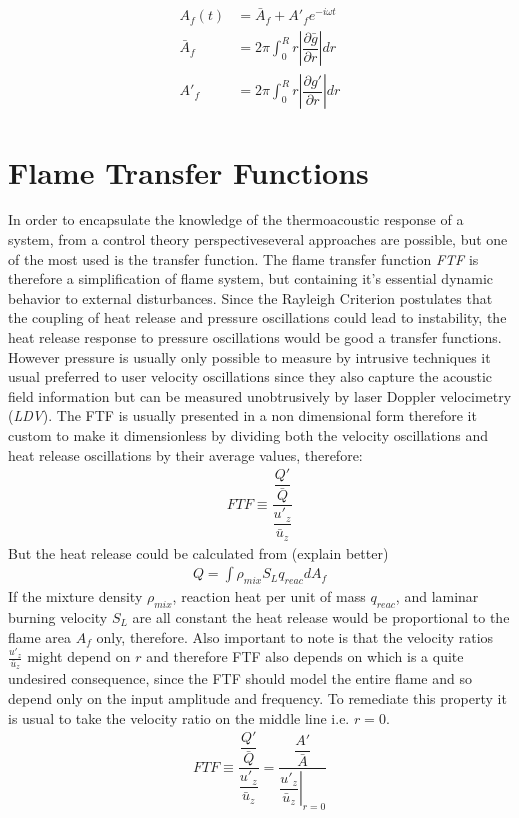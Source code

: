 \begin{align}
A_f(t)&= \bar{A}_f + A'_f e^{-i\omega t}\\
\bar{A}_f&= 2\pi \int_0^R r \left|\dfrac{\partial \bar{g}}{\partial r}\right| dr \label{Ab}\\
A'_f&= 2\pi \int_0^R r \left|\dfrac{\partial g'}{\partial r}\right| dr \label{Al}
\end{align}









\clearpage
\section{Flame Transfer Functions}
In order to encapsulate the knowledge of the thermoacoustic response of a system, from a control theory perspectiveseveral approaches are possible, but one of the most used is the transfer function. The flame transfer function \emph{FTF} is therefore a simplification of flame system, but containing it's essential dynamic behavior to external disturbances. Since the Rayleigh Criterion postulates that the coupling of heat release and pressure oscillations could lead to instability, the heat release response to pressure oscillations would be good a transfer functions. However pressure is usually only possible to measure by intrusive techniques it usual preferred to user velocity oscillations since they also capture the acoustic field information but can be measured unobtrusively by laser Doppler velocimetry (\emph{LDV}). The FTF is usually presented in a non dimensional form therefore it custom to make it dimensionless by dividing both the velocity oscillations and heat release oscillations by their average values, therefore:
\begin{align*}
FTF\equiv \dfrac{\dfrac{Q'}{\bar{Q}}}{\dfrac{u'_z}{\bar{u}_z}}
\end{align*}
But the heat release could be calculated from (explain better)
\begin{align*}
Q= \int \rho_{mix} S_L q_{reac} dA_f
\end{align*}
If the mixture density $\rho_{mix}$, reaction heat per unit of mass $q_{reac}$, and laminar burning velocity $S_L$ are all constant the heat release would be proportional to the flame area $A_f$ only, therefore. Also important to note is that the velocity ratios $\tfrac{u'_z}{\bar{u}_z}$ might depend on $r$ and therefore FTF also depends on which is a quite undesired consequence, since the FTF should model the entire flame and so depend only on the input amplitude and frequency. To remediate this property it is usual to take the velocity ratio on the middle line i.e. $r=0$.  
\begin{align*}
FTF\equiv \dfrac{\dfrac{Q'}{\bar{Q}}}{\dfrac{u'_z}{\bar{u}_z}}=\dfrac{\dfrac{A'}{\bar{A}}}{\left. \dfrac{u'_z}{\bar{u}_z}\right|_{r=0}}
\end{align*}

